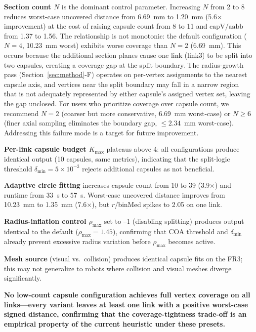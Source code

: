 \textbf{Section count $N$} is the dominant control parameter. Increasing $N$ from 2 to 8 reduces worst-case uncovered distance from 6.69~mm to 1.20~mm (5.6$\times$ improvement) at the cost of raising capsule count from 8 to 11 and $\mathrm{capV/aabb}$ from 1.37 to 1.56. The relationship is not monotonic: the default configuration ($N=4$, 10.23~mm worst) exhibits worse coverage than $N=2$ (6.69~mm). This occurs because the additional section planes cause one link (link3) to be split into two capsules, creating a coverage gap at the split boundary. The radius-growth pass (Section~\ref{sec:method}-F) operates on per-vertex assignments to the nearest capsule axis, and vertices near the split boundary may fall in a narrow region that is not adequately represented by either capsule's assigned vertex set, leaving the gap unclosed. For users who prioritize coverage over capsule count, we recommend $N=2$ (coarser but more conservative, 6.69~mm worst-case) or $N \geq 6$ (finer axial sampling eliminates the boundary gap, $\leq 2.34$~mm worst-case). Addressing this failure mode is a target for future improvement.

\textbf{Per-link capsule budget $K_{\max}$} plateaus above 4: all configurations produce identical output (10 capsules, same metrics), indicating that the split-logic threshold $\delta_{\min} = 5 \times 10^{-3}$ rejects additional capsules as not beneficial.

\textbf{Adaptive circle fitting} increases capsule count from 10 to 39 (3.9$\times$) and runtime from 33~s to 57~s. Worst-case uncovered distance improves from 10.23~mm to 1.35~mm (7.6$\times$), but $r$/binMed spikes to 2.05 on one link.

\textbf{Radius-inflation control $\rho_{\max}$} set to --1 (disabling splitting) produces output identical to the default ($\rho_{\max}=1.45$), confirming that COA threshold and $\delta_{\min}$ already prevent excessive radius variation before $\rho_{\max}$ becomes active.

\textbf{Mesh source} (visual vs.\ collision) produces identical capsule fits on the FR3; this may not generalize to robots where collision and visual meshes diverge significantly.

\textbf{No low-count capsule configuration achieves full vertex coverage on all links---every variant leaves at least one link with a positive worst-case signed distance, confirming that the coverage-tightness trade-off is an empirical property of the current heuristic under these presets.}

